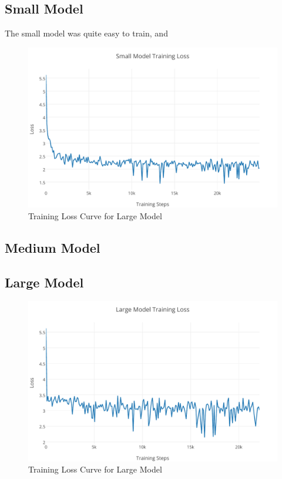 \documentclass[pageno]{jpaper}
\begin{document}
\subsection{Small Model}
The small model was quite easy to train, and 

\begin{figure}[H]
	\centering
	\includegraphics[scale=0.75]{Small_Loss.pdf}
	\caption{Training Loss Curve for Large Model}
	\label{fg:small_loss}
\end{figure}

\subsection{Medium Model}

\subsection{Large Model}

\begin{figure}[H]
	\centering
	\includegraphics[scale=0.75]{Large_Loss.pdf}
	\caption{Training Loss Curve for Large Model}
	\label{fg:large_loss}
\end{figure}
\end{document}

